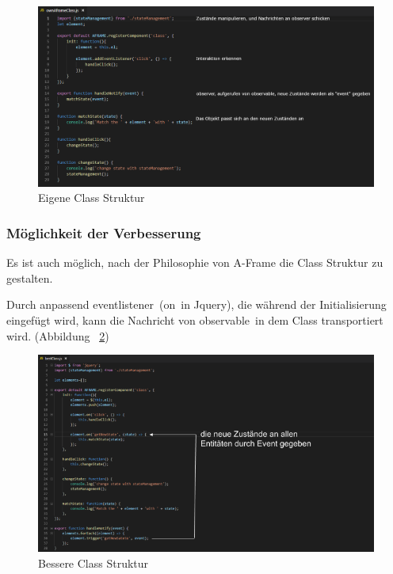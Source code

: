 \begin{figure}[ht]
\vspace*{0.3cm}
\centering
\includegraphics[width=\textwidth]{images/eigenesClass.png}
\caption[Eigene Class Struktur]{Eigene Class Struktur}
\label{fig:eigenesClass} 
\end{figure}
 
 \subsubsection{Möglichkeit der Verbesserung}
 Es ist auch möglich, nach der Philosophie von A-Frame die Class Struktur zu gestalten.
 
 Durch anpassend \glqq eventlistener\grqq\ (\glqq on\grqq\ in Jquery), die während der Initialisierung eingefügt wird, kann die Nachricht von \glqq observable\grqq\ in dem Class transportiert wird. (Abbildung ~\ref{fig:bestesClass})
 
\begin{figure}[ht]
\vspace*{0.3cm}
\centering
\includegraphics[width=\textwidth]{images/bestClass.png}
\caption[Bessere Class Struktur]{Bessere Class Struktur}
\label{fig:bestesClass} 
\end{figure}
 
